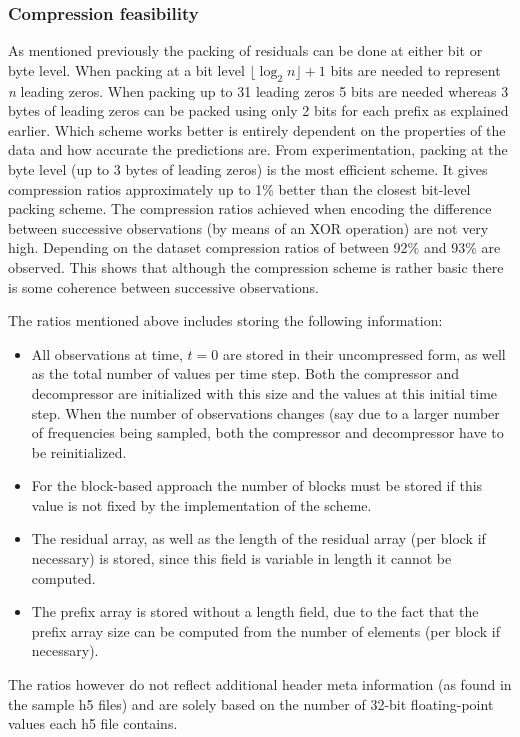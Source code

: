   \subsubsection{Compression feasibility}
  As mentioned previously the packing of residuals can be done at either bit or byte level. When packing at a bit level $\lfloor\log_2n\rfloor + 1$ bits are needed to represent
  \textit{n} leading zeros. When packing up to 31 leading zeros 5 bits are needed whereas 3 bytes of leading zeros can be packed using only 2 bits for each prefix as explained earlier. Which scheme
  works better is entirely dependent on the properties of the data and how accurate the predictions are. From experimentation, packing at the byte level (up to 3 bytes of leading zeros) is the most 
  efficient scheme. It gives compression ratios approximately up to 1\% better than the closest bit-level packing scheme. The compression ratios achieved when encoding the
  difference between successive observations (by means of an XOR operation) are not very high. Depending on the dataset compression ratios of between 92\% and 93\% are observed. This shows that 
  although the compression scheme is rather basic there is some coherence between successive observations. 
  
  The ratios mentioned above includes storing the following information:
  \begin{itemize}
   \item All observations at time, $t=0$ are stored in their uncompressed form, as well as the total number of values per time step. Both the compressor and decompressor are 
   initialized with this size and the values at this initial time step. When the number of observations changes (say due to a larger number of frequencies being sampled, both the
   compressor and decompressor have to be reinitialized.
   \item For the block-based approach the number of blocks must be stored if this value is not fixed by the implementation of the scheme.
   \item The residual array, as well as the length of the residual array (per block if necessary) is stored, since this field is variable in length it cannot be computed.
   \item The prefix array is stored without a length field, due to the fact that the prefix array size can be computed from the number of elements (per block if necessary).
  \end{itemize}
  The ratios however do not reflect additional header meta information (as found in the sample h5 files) and are solely based on the number of 32-bit floating-point values each
  h5 file contains. 
